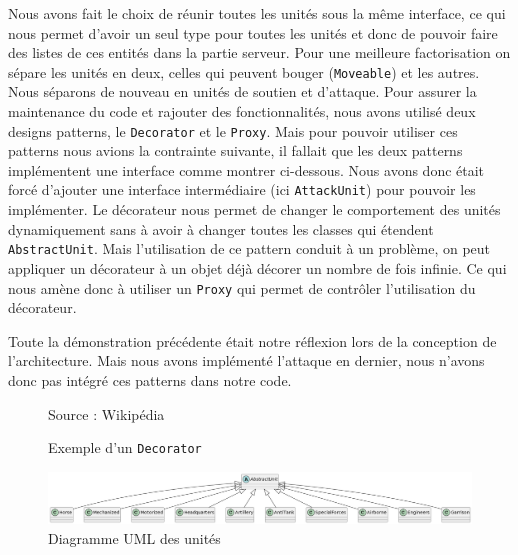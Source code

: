 Nous avons fait le choix de réunir toutes les unités sous la même interface, ce qui nous permet d'avoir un seul type pour toutes les unités et donc de pouvoir faire des listes de ces entités dans la partie serveur.
Pour une meilleure factorisation on sépare les unités en deux, celles qui peuvent bouger (\lstinline{Moveable}) et les autres. Nous séparons de nouveau en unités de soutien et d'attaque. Pour assurer la maintenance du code et rajouter des fonctionnalités, nous avons utilisé deux designs patterns, le \lstinline{Decorator} et le \lstinline{Proxy}. Mais pour pouvoir utiliser ces patterns nous avions la contrainte suivante, il fallait que les deux patterns implémentent une interface comme montrer ci-dessous. Nous avons donc était forcé d'ajouter une interface intermédiaire (ici \lstinline{AttackUnit}) pour pouvoir les implémenter. Le décorateur nous permet de changer le comportement des unités dynamiquement sans à avoir à changer toutes les classes qui étendent \lstinline{AbstractUnit}. Mais l'utilisation de ce pattern conduit à un problème, on peut appliquer un décorateur à un objet déjà décorer un nombre de fois infinie. Ce qui nous amène donc à utiliser un \lstinline{Proxy} qui permet de contrôler l'utilisation du décorateur.

Toute la démonstration précédente était notre réflexion lors de la conception de l'architecture. Mais nous avons implémenté l'attaque en dernier, nous n'avons donc pas intégré ces patterns dans notre code.

\begin{figure}[H]
    \centering
    \def\stackalignment{r}
    {\scriptsize%
        Source : Wikipédia}
    \caption{Exemple d'un {\tt Decorator}}
    \label{fig:UML_Decorator_Pattern_Example}
\end{figure}


\begin{figure}[H]
    \centering
    \includegraphics[scale=0.3]{data/uml_abstract_unit.png}
    \caption{Diagramme UML des unités}
    \label{fig:uml_abstract_unit}
\end{figure}

